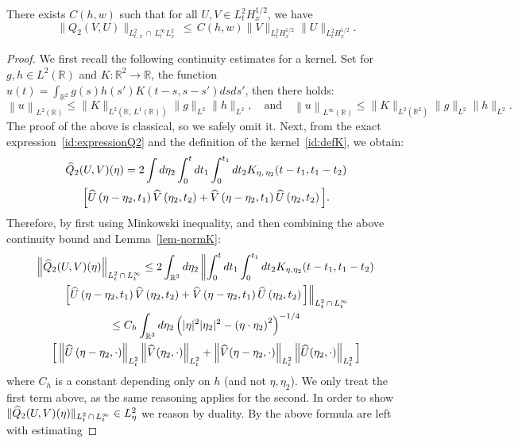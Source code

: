 \documentclass[10pt]{amsart}
\theoremstyle{definition}\newtheorem{defi}[theo]{Definition}\newtheorem{rema}[theo]{Remark}\newtheorem{exam}[theo]{Example}\newtheorem{exem}[theo]{Example}\newtheorem{nota}[theo]{Notation}
\newcommand{\R}{\mathbb{R}}
\let\oldhat\hat
\renewcommand*{\hat}[1]{\mathchoice{\widehat{#1}}{\widehat{#1}}{\oldhat{#1}}{\oldhat{#1}}}
\begin{document}
\begin{prop}\label{prop:QuadV2.2}
There exists $C(h,w)$ such that for all $U,V \in L^2_{t}H^{1/2}_x$, we have
\begin{equation} \label{bd:Q2}
\|Q_2(V,U)\|_{L^2_{t,\,x}\,\cap\,L^{\infty}_tL^2_x}\,\leq \,C(h,w) \|V\|_{L^2_{t}H^{1/2}_x} \|U\|_{L^2_{t}H^{1/2}_x}.
\end{equation}
\end{prop}


\begin{proof}
We first recall the following continuity estimates for a kernel. Set for $g,h\in L^2 (\R)$ and $K: \R^2 \rightarrow \R$, the function $u(t)= \int_{\R^2} g(s)h(s') K(t-s, s - s') dsds'$, then there holds:
\[
\left\| u \right\|_{L^2(\R)} \leq \|K\|_{L^2\left(\R,\, L^1(\R)\right)} \|g\|_{L^2}\|h\|_{L^2}, \quad \text{and} \quad \left\| u \right\|_{L^{\infty}(\R)} \leq \|K\|_{L^2\left(\R^2\right)} \|g\|_{L^2}\|h\|_{L^2}.
\]
The proof of the above is classical, so we safely omit it. Next, from the exact expression~\eqref{id:expressionQ2} and the definition of the kernel~\eqref{id:defK}, we obtain:
\begin{multline*}
\hat Q_2(U,V) (\eta) = 
2\int d\eta_2 \int_{0}^t dt_1 \int_{0}^{t_1} dt_2 K_{\eta,\,\eta_2}(t-t_1,t_1-t_2)\\ \Big[\hat U\left(\eta-\eta_2,t_1\right) \hat V\left(\eta_2,t_2\right) + \hat V\left(\eta-\eta_2,t_1\right) \hat U\left(\eta_2,t_2\right)\Big].
\end{multline*}
Therefore, by first using Minkowski inequality, and then combining the above continuity bound and Lemma~\ref{lem-normK}:
\begin{multline*}
\left\|\hat Q_2(U,V) (\eta)\right\|_{L^2_t\,\cap\, L^{\infty}_t} \leq 
2 \int_{\R^3} d\eta_2 \left\| \int_{0}^t dt_1 \int_{0}^{t_1} dt_2 K_{\eta,\eta_2}(t-t_1,t_1-t_2)\right. \\
\left.\Big[\hat U\left(\eta-\eta_2,t_1\right) \hat V\left(\eta_2,t_2\right) + \hat V\left(\eta-\eta_2,t_1\right) \hat U\left(\eta_2,t_2\right)\Big]\right\|_{L^2_t\,\cap\,L^{\infty}_t}\\
\leq C_h \int_{\R^3} d\eta_2 \left(|\eta|^2|\eta_2|^2 - \left(\eta\cdot\eta_2\right)^2\right)^{-1/4}\\
\Big[\left\|\hat U\left(\eta-\eta_2,\cdot\right)\right\|_{L^2_t}\left\| \hat V(\eta_2,\cdot)\right\|_{L^2_t} + \left\|\hat V(\eta-\eta_2,\cdot)\right\|_{L^2_t}\left\| \hat U(\eta_2,\cdot)\right\|_{L^2_t} \Big]
\end{multline*}
where $C_h$ is a constant depending only on $h$ (and not $\eta,\eta_2$). We only treat the first term above, as the same reasoning applies for the second. In order to show $\|\hat Q_2(U,V) (\eta)\|_{L^2_t\,\cap\, L^{\infty}_t}\in L^2_\eta$ we reason by duality. By the above formula are left with estimating


\end{proof}
\end{document}
